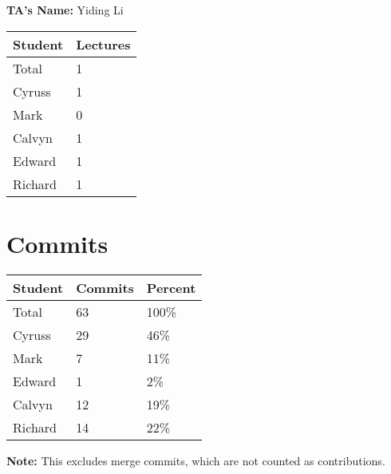 \documentclass{article}
\begin{document}

\noindent \textbf{TA's Name: } Yiding Li

\begin{table}[H]
\centering
\begin{tabular}{ll}
\toprule
\textbf{Student} & \textbf{Lectures}\\
\midrule
Total & 1\\
Cyruss & 1\\
Mark & 0\\
Calvyn & 1\\
Edward & 1\\
Richard & 1\\
\bottomrule
\end{tabular}
\end{table}


\section{Commits}


\begin{table}[H]
\centering
\begin{tabular}{lll}
\toprule
\textbf{Student} & \textbf{Commits} & \textbf{Percent}\\
\midrule
Total & 63 & 100\% \\
Cyruss & 29 & 46\% \\
Mark & 7 & 11\% \\
Edward & 1 & 2\% \\
Calvyn & 12 & 19\% \\
Richard & 14 & 22\% \\
\bottomrule
\end{tabular}
\end{table}

\textbf{Note:} This excludes merge commits, which are not counted as contributions.
\end{document}

